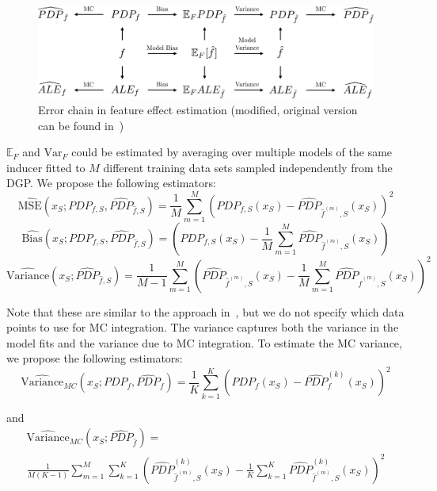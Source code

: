 \documentclass[runningheads]{llncs}
\begin{document}
\begin{figure}[t]
    \includegraphics[width=\textwidth]{img/error_graph.pdf}
    \caption{Error chain in feature effect estimation
        (modified, original version can be found in~\cite{molnar_relating_2023})}\label{fig:error-graph}
\end{figure}

\noindent $\mathbb{E}_F$ and $\text{Var}_F$ could be estimated by averaging over
multiple models of the same inducer fitted to $M$ different training data
sets sampled independently from the DGP. We propose the following estimators:
\begin{equation}
    \widehat{\text{MSE}}(x_S; PDP_{f,S}, \widehat{PDP}_{\hat f,S}) = \frac{1}{M} \sum_{m=1}^{M} {(PDP_{f,S}(x_S) - \widehat{PDP}_{\hat f^{(m)},S}(x_S))}^2
\end{equation}
\begin{equation}
    \widehat{\text{Bias}}(x_S; PDP_{f,S}, \widehat{PDP}_{\hat f,S}) = (PDP_{f,S}(x_S) - \frac{1}{M}\sum_{m=1}^M \widehat{PDP}_{\hat{f}^{(m)},S}(x_S))
\end{equation}
\begin{equation}
    \widehat{\text{Variance}}(x_S; \widehat{PDP}_{\hat f,S}) =
    \frac{1}{M-1}\sum_{m=1}^M\left(\widehat{PDP}_{\hat f^{(m)},S}(x_S) - \frac{1}{M}\sum_{m=1}^M \widehat{PDP}_{\hat f^{(m)},S}(x_S)\right)^2
\end{equation}

\noindent Note that these are similar to the approach in~\cite{molnar_relating_2023},
but we do not specify which data points to use for MC integration. The
variance captures both the variance in the model fits and the variance due to
MC integration. To estimate the MC variance, we propose the following estimators:
\begin{equation}
    \widehat{\text{Variance}}_{MC}(x_S; PDP_f, \widehat{PDP}_f) = \frac{1}{K}\sum_{k=1}^K(PDP_f(x_S) - \widehat{PDP}_f^{(k)}(x_S))^2
\end{equation}

and
\begin{equation}
    \begin{split}
        \widehat{\text{Variance}}_{MC}(x_S; \widehat{PDP}_{\hat{f}}) = \\ \frac{1}{M(K-1)}\sum_{m=1}^M \sum_{k=1}^K
        \left(\widehat{PDP}_{\hat f^{(m)},S}^{(k)}(x_S) - \frac{1}{K}\sum_{k=1}^K \widehat{PDP}_{\hat f^{(m)},S}^{(k)}(x_S)\right)^2
    \end{split}
\end{equation}
\end{document}
